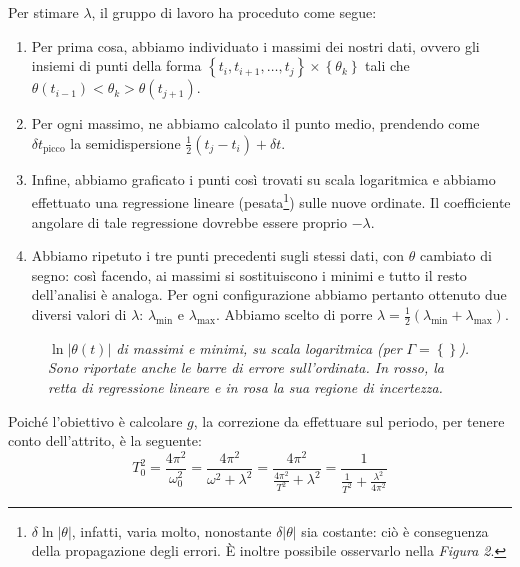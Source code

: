 \documentclass{article}
\begin{document}
Per stimare $\lambda$, il gruppo di lavoro ha proceduto come segue:
\begin{enumerate}
  \item
    Per prima cosa, abbiamo individuato i massimi dei nostri dati,
    ovvero gli insiemi di punti della forma
    $\left\{t_i,t_{i+1},\dots,t_j\right\}\times\left\{\theta_k\right\}$
    tali che $\theta(t_{i-1}) < \theta_k > \theta(t_{j+1})$.
  \item
    Per ogni massimo, ne abbiamo calcolato il punto medio,
    prendendo come $\delta t_\text{picco}$ la semidispersione $\frac{1}{2}(t_j - t_i) + \delta t$.
  \item
    Infine, abbiamo graficato i punti così trovati
    su scala logaritmica e
    abbiamo effettuato una regressione lineare (pesata\footnote{
      $\delta\!\ln{\left|\theta\right|}$, infatti, varia molto,
      nonostante $\delta\!\left|\theta\right|$ sia costante:
      ciò è conseguenza della propagazione degli errori.
      È inoltre possibile osservarlo nella \emph{Figura 2}.
    })
    sulle nuove ordinate. Il coefficiente angolare di tale
    regressione dovrebbe essere proprio $-\lambda$.
  \item
    Abbiamo ripetuto i tre punti precedenti sugli stessi dati,
    con $\theta$ cambiato di segno: così facendo, ai massimi
    si sostituiscono i minimi e tutto il resto dell'analisi
    è analoga. Per ogni configurazione abbiamo pertanto ottenuto
    due diversi valori di $\lambda$: $\lambda_\text{min}$ e
    $\lambda_\text{max}$. Abbiamo scelto di porre
    $\lambda=\frac{1}{2}(\lambda_\text{min}+\lambda_\text{max})$.
\end{enumerate}

\begin{center}
  \begin{figure}[H]
    \caption[]{\emph{
      $\ln\left|\theta(t)\right|$ di massimi e minimi,
      su scala logaritmica (per $\Gamma=\left\{\right\}$).
      Sono riportate anche le barre di errore sull'ordinata.
      In rosso, la retta di regressione lineare
      e in rosa la sua regione di incertezza.
    }}
  \end{figure}
\end{center}

Poiché l'obiettivo è calcolare $g$, la correzione da effettuare
sul periodo, per tenere conto dell'attrito, è la seguente:
\[
  T_0^2 = \frac{4\pi^2}{\omega_0^2}
    = \frac{4\pi^2}{\omega^2 + \lambda^2}
    = \frac{4\pi^2}{\frac{4\pi^2}{T^2} + \lambda^2}
    = \frac{1}{\frac{1}{T^2} + \frac{\lambda^2}{4\pi^2}}
\]
\end{document}
